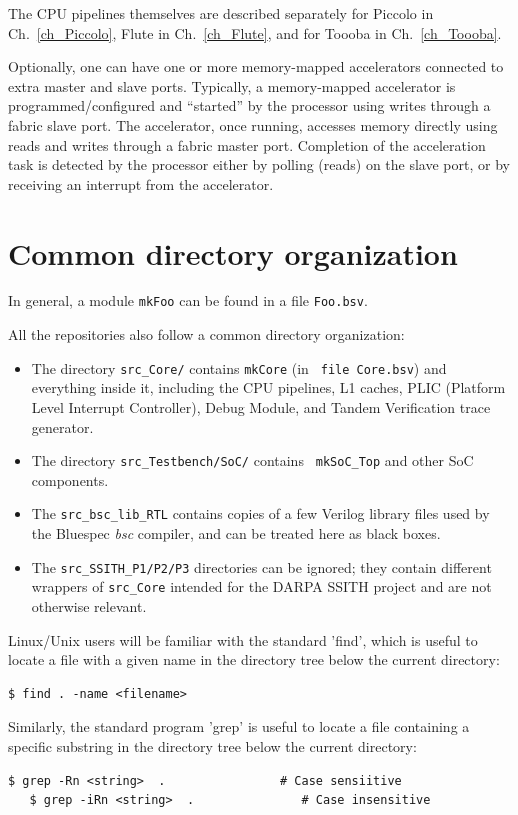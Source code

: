 \documentclass[11pt]{book}
\newcommand{\cf}{\footnotesize\tt}
\begin{document}
The CPU pipelines themselves are described separately for Piccolo in
Ch.~\ref{ch_Piccolo}, Flute in Ch.~\ref{ch_Flute}, and for Toooba in
Ch.~\ref{ch_Toooba}.

Optionally, one can have one or more memory-mapped accelerators
connected to extra master and slave ports.  Typically, a memory-mapped
accelerator is programmed/configured and ``started'' by the processor
using writes through a fabric slave port.  The accelerator, once
running, accesses memory directly using reads and writes through a
fabric master port.  Completion of the acceleration task is detected
by the processor either by polling (reads) on the slave port, or by
receiving an interrupt from the accelerator.


\section{Common directory organization}

In general, a module {\cf mkFoo} can be found in a file {\cf Foo.bsv}.

All the repositories also follow a common directory organization:

\begin{itemize}

\item The directory {\cf src\_Core/} contains {\cf mkCore} (in {\cf
file Core.bsv}) and everything inside it, including the CPU pipelines,
L1 caches, PLIC (Platform Level Interrupt Controller), Debug Module,
and Tandem Verification trace generator.

\item The directory {\cf src\_Testbench/SoC/} contains {\cf
mkSoC\_Top} and other SoC components.

\item The {\cf src\_bsc\_lib\_RTL} contains copies of a few Verilog
library files used by the Bluespec \emph{bsc} compiler, and can be
treated here as black boxes.

\item The {\cf src\_SSITH\_P1/P2/P3} directories can be ignored; they
contain different wrappers of {\cf src\_Core} intended for the DARPA
SSITH project and are not otherwise relevant.

\end{itemize}

Linux/Unix users will be familiar with the standard 'find', which is
useful to locate a file with a given name in the directory tree below
the current directory:
\begin{Verbatim}[frame=single]
   $ find . -name <filename>
\end{Verbatim}
Similarly, the standard program 'grep' is useful to locate a file
containing a specific substring in the directory tree below the
current directory:
\begin{Verbatim}[frame=single]
   $ grep -Rn <string>  .                # Case sensiitive
   $ grep -iRn <string>  .               # Case insensitive
\end{Verbatim}
\end{document}
